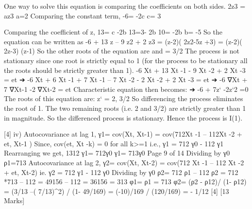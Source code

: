 One way to solve this equation is comparing the coefficients on both sides.
2z3 = az3
a=2
Comparing the constant term,
-6= -2c
c= 3

Comparing the coefficient of z,
13= c -2b
13=3- 2b
10= -2b
b= -5 
So the equation can be written as
-6 + 13 z – 9 z2 + 2 z3 = (z-2)( 2z2-5z +3)
= (z-2)( 2z-3) (z-1)
So the other roots of the equation are  and \lambda = 3/2
The process is not stationary since one root is strictly equal to 1 (for the process to be stationary all the roots should be strictly greater than 1). 
-6 Xt + 13 Xt -1 - 9 Xt -2 + 2 Xt -3 = et
➔ -6 Xt + 6 Xt -1 + 7 Xt -1 – 7 Xt -2 - 2 Xt -2 + 2 Xt -3 = et
➔ -6 ∇Xt + 7 ∇Xt-1 -2 ∇Xt-2 = et
Characteristic equation then becomes:
➔ -6 + 7z` -2z`2 =0
The roots of this equation are: z` = 2, 3/2
So differencing the process eliminates the root of 1. The two remaining roots (i.e. 2 and 3/2) are strictly greater than 1 in magnitude.
So the differenced process is stationary. Hence the process is I(1).

[4]
iv)
Autocovariance at lag 1, γ1= cov(Xt, Xt-1)
= cov(712Xt -1 – 112Xt -2 + et, Xt-1 )
Since, cov(et, Xt -k) = 0 for all k>=1
i.e., γ1 = 712 γ0 - 112 γ1
Rearranging we get,
1312 γ1= 712γ0
γ1= 713γ0
Page 9 of 14
Dividing by γ0
ρ1=713
Autocovariance at lag 2, γ2= cov(Xt, Xt-2)
= cov(712 Xt -1 – 112 Xt -2 + et, Xt-2)
ie. γ2 = 712 γ1 - 112 γ0
Dividing by γ0
ρ2= 712 ρ1 – 112
ρ2 = 712 *713 – 112 = 49156 – 112 = 36156 = 313
φ1= ρ1 = 713
φ2= (ρ2 - ρ12)/ (1- ρ12)
= (3/13 –( 7/13)^2) / (1- 49/169)
= (-10)/169 / (120/169)
= - 1/12
[4]
[13 Marks]
